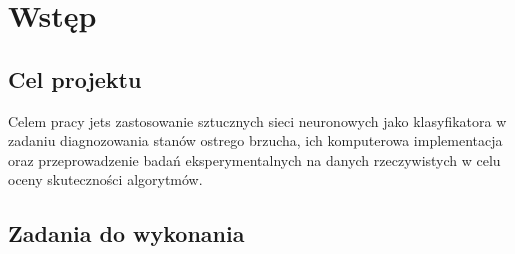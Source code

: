 %
%
%
%
%
%





    \maketitle
    \tableofcontents

    \chapter{Wstęp}\label{ch:wstęp}

    \section{Cel projektu}\label{sec:celProjektu}

    Celem pracy jets zastosowanie sztucznych sieci neuronowych jako klasyfikatora w zadaniu diagnozowania stanów ostrego brzucha, ich komputerowa implementacja oraz przeprowadzenie badań eksperymentalnych na danych rzeczywistych w celu oceny skuteczności algorytmów.

    \section{Zadania do wykonania}\label{sec:zadaniaDoWykonania}


